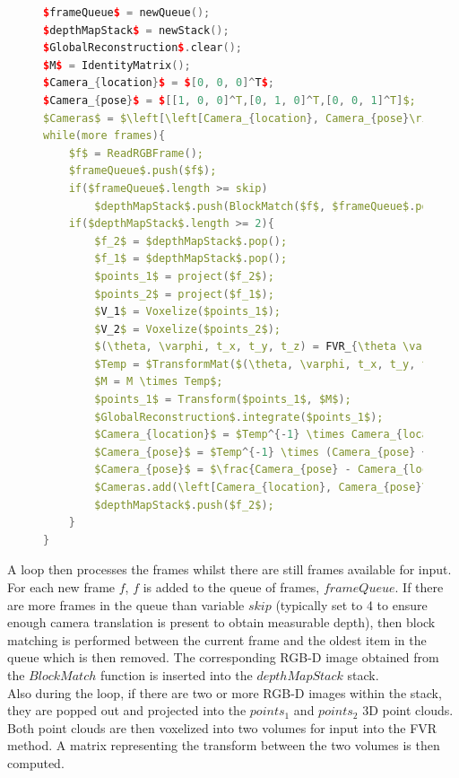 \begin{figure}
\begin{lstlisting}[language=c++,caption=Monocular View Volume Reconstruction,label=algorithm:MVVRAlgorithm,mathescape,basicstyle=\ttfamily]
$frameQueue$ = newQueue();
$depthMapStack$ = newStack();
$GlobalReconstruction$.clear();
$M$ = IdentityMatrix();
$Camera_{location}$ = $[0, 0, 0]^T$;
$Camera_{pose}$ = $[[1, 0, 0]^T,[0, 1, 0]^T,[0, 0, 1]^T]$;
$Cameras$ = $\left[\left[Camera_{location}, Camera_{pose}\right] \right]$;
while(more frames){
	$f$ = ReadRGBFrame();
	$frameQueue$.push($f$);
	if($frameQueue$.length >= skip)
		$depthMapStack$.push(BlockMatch($f$, $frameQueue$.pop()))
	if($depthMapStack$.length >= 2){
		$f_2$ = $depthMapStack$.pop();
		$f_1$ = $depthMapStack$.pop();
		$points_1$ = project($f_2$);
		$points_2$ = project($f_1$);
		$V_1$ = Voxelize($points_1$);
		$V_2$ = Voxelize($points_2$);
		$(\theta, \varphi, t_x, t_y, t_z) = FVR_{\theta \varphi t_x t_y t_z}(V_1, V_2)$;
		$Temp = $TransformMat($(\theta, \varphi, t_x, t_y, t_z)$);
		$M = M \times Temp$;
		$points_1$ = Transform($points_1$, $M$);
		$GlobalReconstruction$.integrate($points_1$);
		$Camera_{location}$ = $Temp^{-1} \times Camera_{location}$;
		$Camera_{pose}$ = $Temp^{-1} \times (Camera_{pose} + Camera_{location})$;
		$Camera_{pose}$ = $\frac{Camera_{pose} - Camera_{location}}{Camera_{pose} - Camera_{location}}$;
		$Cameras.add(\left[Camera_{location}, Camera_{pose}\right])$;
		$depthMapStack$.push($f_2$);
	}
}
\end{lstlisting}
\end{figure}


A loop then processes the frames whilst there are still frames available for input. For each new frame $f$, $f$ is added to the queue of frames, $frameQueue$. If there are more frames in the queue than variable $skip$ (typically set to 4 to ensure enough camera translation is present to obtain measurable depth), then block matching is performed between the current frame and the oldest item in the queue which is then removed. The corresponding RGB-D image obtained from the $BlockMatch$ function is inserted into the $depthMapStack$ stack. \\

Also during the loop, if there are two or more RGB-D images within the stack, they are popped out and projected into the $points_1$ and $points_2$ 3D point clouds. Both point clouds are then voxelized into two volumes for input into the FVR method. A matrix representing the transform between the two volumes is then computed. \\

